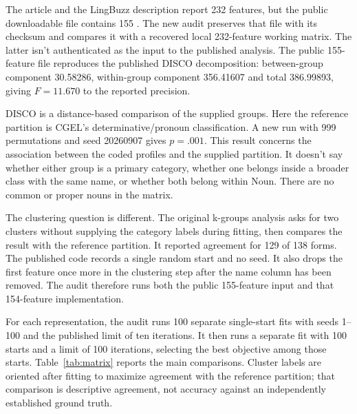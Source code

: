 \documentclass[12pt]{article}
\begin{document}
The article and the LingBuzz description report 232 features, but the public downloadable file contains 155 \citep{reynolds2021matrix}. The new audit preserves that file with its checksum and compares it with a recovered local 232-feature working matrix. The latter isn't authenticated as the input to the published analysis. The public 155-feature file reproduces the published DISCO decomposition: between-group component 30.58286, within-group component 356.41607 and total 386.99893, giving $F=11.670$ to the reported precision.

DISCO is a distance-based comparison of the supplied groups. Here the reference partition is CGEL's determinative/pronoun classification. A new run with 999 permutations and seed 20260907 gives $p=.001$. This result concerns the association between the coded profiles and the supplied partition. It doesn't say whether either group is a primary category, whether one belongs inside a broader class with the same name, or whether both belong within Noun. There are no common or proper nouns in the matrix.

The clustering question is different. The original k-groups analysis asks for two clusters without supplying the category labels during fitting, then compares the result with the reference partition. It reported agreement for 129 of 138 forms. The published code records a single random start and no seed. It also drops the first feature once more in the clustering step after the name column has been removed. The audit therefore runs both the public 155-feature input and that 154-feature implementation.

For each representation, the audit runs 100 separate single-start fits with seeds 1--100 and the published limit of ten iterations. It then runs a separate fit with 100 starts and a limit of 100 iterations, selecting the best objective among those starts. Table~\ref{tab:matrix} reports the main comparisons. Cluster labels are oriented after fitting to maximize agreement with the reference partition; that comparison is descriptive agreement, not accuracy against an independently established ground truth.
\end{document}
